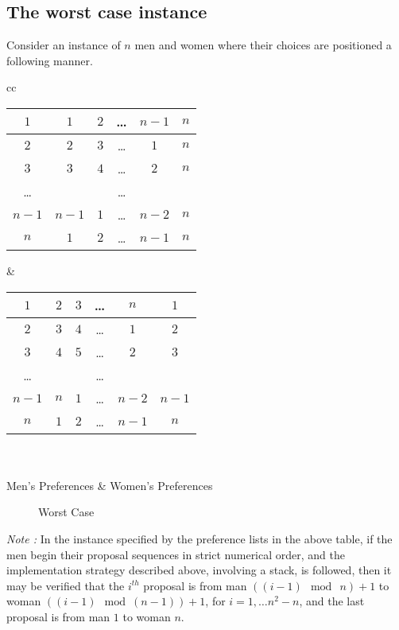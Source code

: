 \subsection{The worst case instance}
Consider an instance of $n$ men and women where their choices are positioned a following manner.
\begin{center}
\begin{tabular}{ cc }   %
\begin{tabular}{ |c || c c c c c| } 
\hline
$1$ & $1$ & $2$ & \ldots & $n-1$ & $n$\\
\hline
$2$ & $2$ & $3$ & \ldots & $1$ & $n$\\
\hline
$3$ & $3$ & $4$ & \ldots & $2$ & $n$\\
\hline
\ldots & & & \ldots & & \\
\hline
$n-1$ & $n-1$ & $1$ & \ldots & $n-2$ & $n$\\
\hline
$n$ & $1$ & $2$ & \ldots & $n-1$ & $n$\\
\hline
\end{tabular} &  %
\begin{tabular}{ |c || c c c c c| } 
\hline
$1$ & $2$ & $3$ & \ldots & $n$ & $1$\\
\hline
$2$ & $3$ & $4$ & \ldots & $1$ & $2$\\
\hline
$3$ & $4$ & $5$ & \ldots & $2$ & $3$\\
\hline
\ldots & & & \ldots & & \\
\hline
$n-1$ & $n$ & $1$ & \ldots & $n-2$ & $n-1$\\
\hline
$n$ & $1$ & $2$ & \ldots & $n-1$ & $n$\\
\hline
\end{tabular}\\ \\
Men's Preferences & Women's Preferences \\
\end{tabular}

\begin{figure}[ht]
  \caption{Worst Case}
  \label{FIG_1_9}
\end{figure}

\end{center}

\textit{Note :} In the instance specified by the preference lists in the above table, if the men begin their proposal sequences in strict numerical order, and the implementation strategy described above, involving a stack, is followed, then it may be verified that the $i^{th}$ proposal is from man $((i-1) \mod\:n) + 1$ to woman $((i-1) \mod(n-1))+1$, for $i = 1, \ldots n^2-n$, and the last proposal is from man $1$ to woman $n$.

